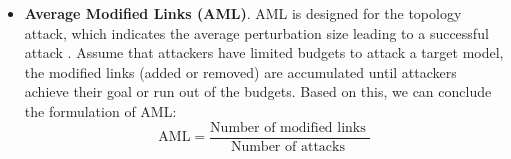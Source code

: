 \begin{itemize}
	\item \textbf{Average Modified Links (AML)}. AML is designed for the topology attack, which indicates the average perturbation size leading to a successful attack \cite{chen2018link}. Assume that attackers have limited budgets to attack a target model, the modified links (added or removed) are accumulated until attackers achieve their goal or run out of the budgets. Based on this, we can conclude the formulation of AML:
	      \begin{equation}
		      \text{AML}=\frac{\text {Number  of  modified  links }}{\text {Number  of  attacks }}
	      \end{equation}



\end{itemize}

